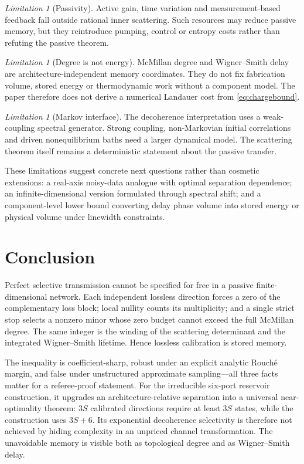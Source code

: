 \documentclass[11pt]{article}
\theoremstyle{definition}
\theoremstyle{remark}
\newtheorem{limitation}[theorem]{Limitation}
\begin{document}
\begin{limitation}[Passivity]
Active gain, time variation and measurement-based feedback fall outside
rational inner scattering.  Such resources may reduce passive memory, but
they reintroduce pumping, control or entropy costs rather than refuting the
passive theorem.
\end{limitation}

\begin{limitation}[Degree is not energy]
McMillan degree and Wigner--Smith delay are architecture-independent memory
coordinates.  They do not fix fabrication volume, stored energy or
thermodynamic work without a component model.  The paper therefore does not
derive a numerical Landauer cost from \eqref{eq:chargebound}.
\end{limitation}

\begin{limitation}[Markov interface]
The decoherence interpretation uses a weak-coupling spectral generator.
Strong coupling, non-Markovian initial correlations and driven nonequilibrium
baths need a larger dynamical model.  The scattering theorem itself remains
a deterministic statement about the passive transfer.
\end{limitation}

These limitations suggest concrete next questions rather than cosmetic
extensions: a real-axis noisy-data analogue with optimal separation
dependence; an infinite-dimensional version formulated through spectral
shift; and a component-level lower bound converting delay phase volume into
stored energy or physical volume under linewidth constraints.

\section{Conclusion}

Perfect selective transmission cannot be specified for free in a passive
finite-dimensional network.  Each independent lossless direction forces a
zero of the complementary loss block; local nullity counts its multiplicity;
and a single strict stop selects a nonzero minor whose zero budget cannot
exceed the full McMillan degree.  The same integer is the winding of the
scattering determinant and the integrated Wigner--Smith lifetime.  Hence
lossless calibration is stored memory.

The inequality is coefficient-sharp, robust under an explicit analytic
Rouch\'e margin, and false under unstructured approximate sampling---all three
facts matter for a referee-proof statement.  For the irreducible six-port
reservoir construction, it upgrades an architecture-relative separation into
a universal near-optimality theorem: $3S$ calibrated directions require at
least $3S$ states, while the construction uses $3S+6$.  Its exponential
decoherence selectivity is therefore not achieved by hiding complexity in an
unpriced channel transformation.  The unavoidable memory is visible both as
topological degree and as Wigner--Smith delay.
\end{document}
